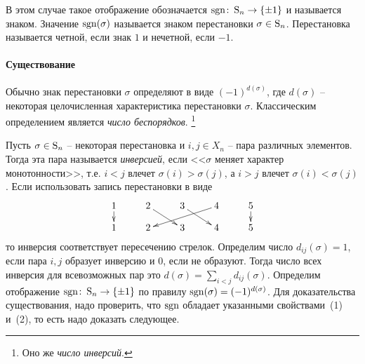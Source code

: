 В этом случае такое отображение обозначается $\operatorname{sgn}\colon \operatorname{S}_{n}\to \{\pm1\}$ и называется знаком.
Значение $\operatorname{sgn}(\sigma)$ называется знаком перестановки $\sigma\in\operatorname{S}_{n}$.
Перестановка называется четной, если знак $1$ и нечетной, если $-1$.



\paragraph{Существование}

Обычно знак перестановки $\sigma$ определяют в виде $(-1)^{d(\sigma)}$, где $d(\sigma)$ -- некоторая целочисленная характеристика перестановки $\sigma$.
Классическим определением является {\it число беспорядков}.%
\footnote{Оно же {\it число инверсий}.} 

Пусть $\sigma \in\operatorname{S}_{n}$ -- некоторая перестановка и $i,j\in X_n$ -- пара различных элементов.
Тогда эта пара называется {\it инверсией}, если <<$\sigma$ меняет характер монотонности>>, т.е. $i<j$ влечет $\sigma(i)>\sigma(j)$, а $i>j$ влечет $\sigma(i)<\sigma(j)$.
Если использовать запись перестановки в виде
\[
\xymatrix@R=10pt{
	{1}\ar[d]&{2}\ar[dr]&{3}\ar[dr]&{4}\ar[dll]&{5}\ar[d]\\
	{1}&{2}&{3}&{4}&{5}
}
\]
то инверсия соответствует пересечению стрелок.
Определим число $d_{ij}(\sigma) = 1$, если пара $i, j$ образует инверсию и $0$, если не образуют.
Тогда число всех инверсия для всевозможных пар это $d(\sigma) = \sum_{i < j} d_{ij}(\sigma)$.
Определим отображение $\operatorname{sgn}\colon \operatorname{S}_{n}\to \{\pm 1\}$ по правилу $\operatorname{sgn}(\sigma) = (-1)^{d(\sigma)}$.
Для доказательства существования, надо проверить, что $\operatorname{sgn}$ обладает указанными свойствами~(1) и~(2), то есть надо доказать следующее.

